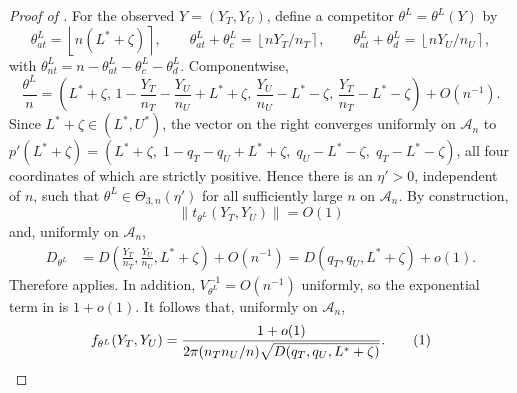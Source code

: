 \documentclass[12pt,reqno]{amsart}
\theoremstyle{theorem}
\theoremstyle{definition}
\newcommand\numberthis{\addtocounter{equation}{1}\tag{\theequation}}
\newcommand{\0}{\mathbf{0}}
\newcommand{\1}{\mathbf{1}}
\begin{document}
\begin{proof}[Proof of ]
{For the observed \(Y=(Y_T,Y_U)\), define a competitor
\(\theta^L=\theta^L(Y)\) by
\[
\theta^L_{at}=\left\lfloor n(L^*+\zeta)\right\rceil,\qquad
\theta^L_{at}+\theta^L_c=\left\lfloor nY_T/n_T\right\rceil,\qquad
\theta^L_{at}+\theta^L_d=\left\lfloor nY_U/n_U\right\rceil,
\]
with \(\theta^L_{nt}=n-\theta^L_{at}-\theta^L_c-\theta^L_d\).  Componentwise,
\[
\frac{\theta^L}{n}
=
\left(
L^*+\zeta,\,
1-\frac{Y_T}{n_T}-\frac{Y_U}{n_U}+L^*+\zeta,\,
\frac{Y_U}{n_U}-L^*-\zeta,\,
\frac{Y_T}{n_T}-L^*-\zeta
\right)
+O(n^{-1}).
\]
Since \(L^*+\zeta\in(L^*,U^*)\), the vector on the right converges uniformly
on \(\mathcal A_n\) to \(p'(L^*+\zeta) = \left(
L^*+\zeta,\;
1-q_T-q_U+L^*+\zeta,\;
q_U-L^*-\zeta,\;
q_T-L^*-\zeta
\right)\), all four coordinates of which are
strictly positive.  Hence there is an \(\eta'>0\), independent of \(n\), such
that \(\theta^L\in\Theta_{3,n}(\eta')\) for all sufficiently large \(n\) on
\(\mathcal A_n\).  By construction, 
\[
\|t_{\theta^L}(Y_T,Y_U)\|=O(1)
\]
and, uniformly on \(\mathcal A_n\),
\[
\begin{aligned}
D_{\theta^L}
&=
D\left(\frac{Y_T}{n_T},\frac{Y_U}{n_U},L^*+\zeta\right)+O(n^{-1})=
D(q_T,q_U,L^*+\zeta)+o(1).
\end{aligned}
\]
Therefore  applies.  In addition,
\(V_{\theta^L}^{-1}=O(n^{-1})\) uniformly, so the exponential term in
 is \(1+o(1)\).  It follows that, uniformly on
\(\mathcal A_n\),
\[
f_{\theta^L}(Y_T,Y_U)
=
\frac{1+o(1)}
{2\pi(n_Tn_U/n)\sqrt{D(q_T,q_U,L^*+\zeta)}}. \numberthis
\label{eq:lower-comp-unified}
\]}


\end{proof}
\end{document}
